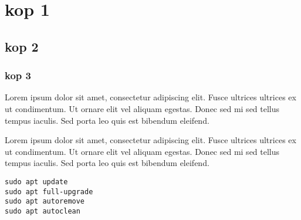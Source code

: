 \documentclass[../main.tex]{subfiles}
\begin{document}

\section{kop 1}

\subsection{kop 2}

\subsubsection{kop 3}

Lorem ipsum dolor sit amet, consectetur adipiscing elit. Fusce ultrices ultrices ex ut condimentum. Ut ornare elit vel aliquam egestas. Donec sed mi sed tellus tempus iaculis. Sed porta leo quis est bibendum eleifend.  

Lorem ipsum dolor sit amet, consectetur adipiscing elit. Fusce ultrices ultrices ex ut condimentum. Ut ornare elit vel aliquam egestas. Donec sed mi sed tellus tempus iaculis. Sed porta leo quis est bibendum eleifend.

\begin{lstlisting}
sudo apt update
sudo apt full-upgrade
sudo apt autoremove
sudo apt autoclean
\end{lstlisting}
\end{document}
